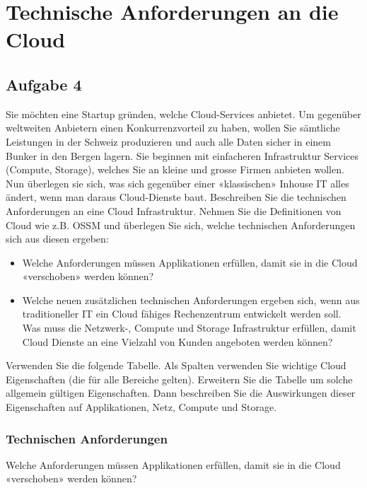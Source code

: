 \documentclass[11pt,titlepage]{article}
\newenvironment{shadedquotation}
 {\begin{shaded*}
  \quoting[leftmargin=0pt, vskip=0pt]
 }
 {\endquoting
 \end{shaded*}
}
\begin{document}
\section{Technische Anforderungen an die Cloud}
\subsection{Aufgabe 4}
\label{sec:Aufgabe-4}
\begin{shadedquotation}
  Sie möchten eine Startup gründen, welche Cloud-Services anbietet. Um gegenüber weltweiten
  Anbietern einen Konkurrenzvorteil zu haben, wollen Sie sämtliche Leistungen in der Schweiz
  produzieren und auch alle Daten sicher in einem Bunker in den Bergen lagern. Sie beginnen mit
  einfacheren Infrastruktur Services (Compute, Storage), welches Sie an kleine und grosse Firmen
  anbieten wollen. Nun überlegen sie sich, was sich gegenüber einer «klassischen» Inhouse IT alles ändert,
  wenn man daraus Cloud-Dienste baut. Beschreiben Sie die technischen Anforderungen an eine Cloud
  Infrastruktur. Nehmen Sie die Definitionen von Cloud wie z.B. OSSM und überlegen Sie sich, welche
  technischen Anforderungen sich aus diesen ergeben:

  \begin{itemize}
    \item Welche Anforderungen müssen Applikationen erfüllen, damit sie in die Cloud «verschoben» werden können?
    \item Welche neuen zusätzlichen technischen Anforderungen ergeben sich, wenn aus traditioneller IT
    ein Cloud fähiges Rechenzentrum entwickelt werden soll. Was muss die Netzwerk-, Compute
    und Storage Infrastruktur erfüllen, damit Cloud Dienste an eine Vielzahl von Kunden angeboten
    werden können?
  \end{itemize}

  Verwenden Sie die folgende Tabelle. Als Spalten verwenden Sie wichtige Cloud Eigenschaften (die für
  alle Bereiche gelten). Erweitern Sie die Tabelle um solche allgemein gültigen Eigenschaften. Dann
  beschreiben Sie die Auswirkungen dieser Eigenschaften auf Applikationen, Netz, Compute und Storage.
\end{shadedquotation}

\subsubsection{Technischen Anforderungen}
\label{sec:Aufgabe-4_technic}
\begin{shadedquotation}
  Welche Anforderungen müssen Applikationen erfüllen, damit sie in die Cloud «verschoben» werden können?
\end{shadedquotation}
\end{document}
